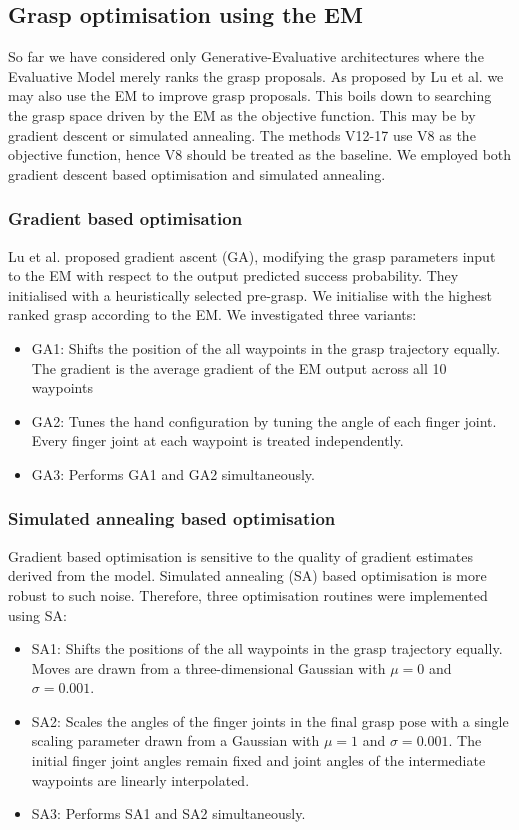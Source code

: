 \subsection{Grasp optimisation using the EM}

So far we have considered only Generative-Evaluative architectures where the Evaluative Model merely ranks the grasp proposals. As proposed by Lu et al. \cite{lu2017planning} we may also use the EM to improve grasp proposals. This boils down to searching the grasp space driven by the EM as the objective function. This may be by gradient descent or simulated annealing. The methods V12-17 use V8 as the objective function, hence V8 should be treated as the baseline. We employed both gradient descent based optimisation and simulated annealing.

\subsubsection{Gradient based optimisation}
Lu et al. \cite{lu2017planning} proposed gradient ascent (GA), modifying the grasp parameters input to the EM with respect to the output predicted success probability. They initialised with a heuristically selected pre-grasp. We initialise with the highest ranked grasp according to the EM. We investigated three variants:
\begin{itemize}
\item GA1: Shifts the position of the all waypoints in the grasp trajectory equally. The gradient is the average gradient of the EM output across all 10 waypoints
\item GA2: Tunes the hand configuration by tuning the angle of each finger joint. Every finger joint at each waypoint is treated independently.
\item GA3: Performs GA1 and GA2 simultaneously.
\end{itemize}

\subsubsection{Simulated annealing based optimisation}
Gradient based optimisation is sensitive to the quality of gradient estimates derived from the model. Simulated annealing (SA) based optimisation is more robust to such noise. Therefore, three optimisation routines were implemented using SA:
\begin{itemize}
\item SA1: Shifts the positions of the all waypoints in the grasp trajectory equally. Moves are drawn from a three-dimensional Gaussian with $\mu=0$ and $\sigma=0.001$. 
\item SA2: Scales the angles of the finger joints in the final grasp pose with a single scaling parameter drawn from a Gaussian with $\mu=1$ and $\sigma=0.001$. The initial finger joint angles remain fixed and joint angles of the intermediate waypoints are linearly interpolated. 
\item SA3: Performs SA1 and SA2 simultaneously.
\end{itemize}